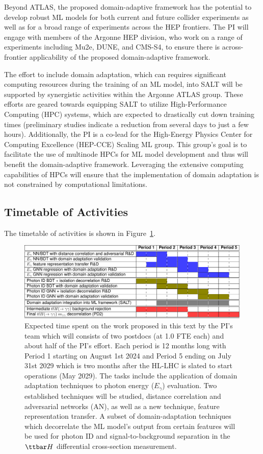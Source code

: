 \documentclass[letter, USenglish, 11pt, subfigure]{article}
\begin{document}
Beyond ATLAS, the proposed domain-adaptive framework has the potential to develop robust ML models for both current and future collider experiments as well as for a broad range of experiments across the HEP frontiers. The PI will engage with members of the Argonne HEP division, who work on a range of experiments including Mu2e, DUNE, and CMS-S4, to ensure there is across-frontier applicability of the proposed domain-adaptive framework.

The effort to include domain adaptation, which can requires significant computing resources during the training of an ML model, into SALT will be supported by synergistic activities within the Argonne ATLAS group. These efforts are geared towards equipping SALT to utilize High-Performance Computing (HPC) systems, which are expected to drastically cut down training times (preliminary studies indicate a reduction from several days to just a few hours). Additionally, the PI is a co-lead for the High-Energy Physics Center for Computing Excellence (HEP-CCE) Scaling ML group. This group's goal is to facilitate the use of multinode HPCs for ML model development and thus will benefit the domain-adaptive framework. Leveraging the extensive computing capabilities of HPCs will ensure that the implementation of domain adaptation is not constrained by computational limitations.

\subsection{Timetable of Activities}
\label{sec:timetable}

The timetable of activities is shown in Figure~\ref{fig:timetable}.
\begin{figure}[!htbp]
  \centering
  \includegraphics[width=\textwidth]{figures/timeline.pdf}
  \caption{Expected time spent on the work proposed in this text by the PI's team which will consists of two postdocs (at 1.0 FTE each) and about half of the PI's effort. Each period is 12 months long with Period 1 starting on August 1st 2024 and Period 5 ending on July 31st 2029 which is two months after the HL-LHC is slated to start operations (May 2029). The tasks include the application of domain adaptation  techniques to photon energy ($E_{\gamma}$) evaluation. Two established techniques will be studied, distance correlation and adversarial networks (AN), as well as a new technique, feature representation transfer. A subset of domain-adaptation techniques which decorrelate the ML model's output from certain features will be used for photon ID and signal-to-background separation in the $\ttbar H$ differential cross-section measurement.
  }
  \label{fig:timetable}
\end{figure}
\end{document}
